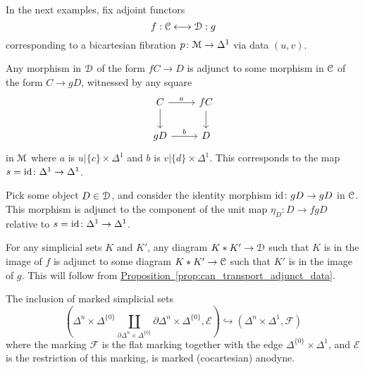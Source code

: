 \documentclass[main.tex]{subfiles}
\begin{document}
In the next examples, fix adjoint functors
\begin{equation*}
  f : \mathcal{C} \longleftrightarrow \mathcal{D} : g
\end{equation*}
corresponding to a bicartesian fibration $p\colon \mathcal{M} \to \Delta^{1}$ via data $(u, v)$.

\begin{example}
  Any morphism in $\mathcal{D}$ of the form $fC \to D$ is adjunct to some morphism in $\mathcal{C}$ of the form $C \to gD$, witnessed by any square
  \begin{equation*}
    \begin{tikzcd}
      C
      \arrow[r, "a"]
      \arrow[d]
      & fC
      \arrow[d]
      \\
      gD
      \arrow[r, "b"]
      & D
    \end{tikzcd}
  \end{equation*}
  in $\mathcal{M}$ where $a$ is $u|\{c\} \times \Delta^{1}$ and $b$ is $v|\{d\} \times \Delta^{1}$. This corresponds to the map $s = \mathrm{id}\colon \Delta^{1} \to \Delta^{1}$.
\end{example}

\begin{example}
  Pick some object $D \in \mathcal{D}$, and consider the identity morphism $\mathrm{id}\colon gD \to gD$ in $\mathcal{C}$. This morphism is adjunct to the component of the unit map $\eta_{D}\colon D \to fgD$ relative to $s = \mathrm{id}\colon \Delta^{1} \to \Delta^{1}$.
\end{example}


\begin{example}
  For any simplicial sets $K$ and $K'$, any diagram $K \ast K' \to \mathcal{D}$ such that $K$ is in the image of $f$ is adjunct to some diagram $K \ast K' \to \mathcal{C}$ such that $K'$ is in the image of $g$. This will follow from \hyperref[prop:can_transport_adjunct_data]{Proposition~\ref*{prop:can_transport_adjunct_data}}.
\end{example}

\begin{lemma}
  \label{lemma:left_cylinder_inclusion_marked_anodyne}
  The inclusion of marked simplicial sets
  \begin{equation}
    \label{eq:cocartesian_anodyne_morphism}
    \left( \Delta^{n} \times \Delta^{\{0\}} \coprod_{\partial \Delta^{n} \times \Delta^{\{0\}}} \partial \Delta^{n} \times \Delta^{\{0\}}, \mathcal{E} \right) \hookrightarrow (\Delta^{n} \times \Delta^{1}, \mathcal{F})
  \end{equation}
  where the marking $\mathcal{F}$ is the flat marking together with the edge $\Delta^{\{0\}} \times \Delta^{1}$, and $\mathcal{E}$ is the restriction of this marking, is marked (cocartesian) anodyne.
\end{lemma}
\end{document}
